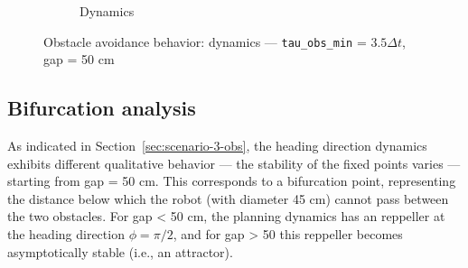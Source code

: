 \begin{figure}[!hbt]
\begin{subfigure}{.5\textwidth}
  \caption{Dynamics}%
\label{fig:obs-2-3-50cm-2}
\end{subfigure}
  \caption{Obstacle avoidance behavior: dynamics --- \texttt{tau\_obs\_min} =
    $3.5 \Delta t$, gap = 50 cm}%
\label{fig:obs-2-3-50cm}
\end{figure}
%
\subsection{Bifurcation analysis}%
\label{sec:bifurcation-analysis-obs}
As indicated in Section~\ref{sec:scenario-3-obs}, the heading direction dynamics
exhibits different qualitative behavior --- the stability of the fixed
points varies --- starting from gap = 50 cm. This corresponds to a bifurcation
point, representing the distance below which the robot
(with diameter 45 cm) cannot pass between the two obstacles. For gap < 50 cm, the planning dynamics has an reppeller
at the heading direction $\phi = \pi/2$, and for gap > 50 this reppeller becomes
asymptotically stable (i.e., an attractor).

